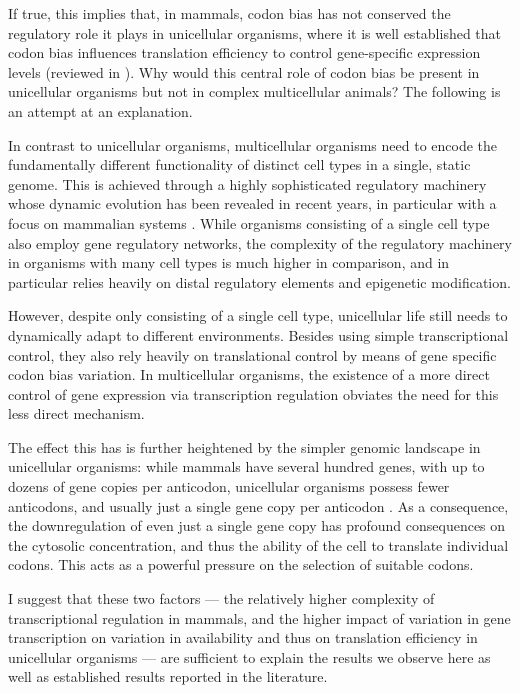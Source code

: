 If true, this implies that, in mammals, codon bias has not conserved the
regulatory role it plays in unicellular organisms, where it is well established
that codon bias influences translation efficiency to control gene-specific
expression levels (reviewed in \citet{Plotkin:2010a}). Why would this central
role of codon bias be present in unicellular organisms but not in complex
multicellular animals? The following is an attempt at an explanation.

In contrast to unicellular organisms, multicellular organisms need to encode the
fundamentally different functionality of distinct cell types in a single, static
genome. This is achieved through a highly sophisticated regulatory machinery
whose dynamic evolution has been revealed in recent years, in particular with a
focus on mammalian systems \citep{Villar:2015}. While  organisms consisting of a
single cell type also employ gene regulatory networks, the complexity of the
regulatory machinery in organisms with many cell types is much higher in
comparison, and in particular relies heavily on distal regulatory elements and
epigenetic modification.

However, despite only consisting of a single cell type, unicellular life still
needs to dynamically adapt to different environments. Besides using simple
transcriptional control, they also rely heavily on translational control by
means of gene specific codon bias variation. In multicellular organisms, the
existence of a more direct control of gene expression via transcription
regulation obviates the need for this less direct mechanism.

The effect this has is further heightened by the simpler genomic \trna landscape
in unicellular organisms: while mammals have several hundred \trna genes, with
up to dozens of gene copies per anticodon, unicellular organisms possess fewer
anticodons, and usually just a single \trna gene copy per anticodon
\citep{Chan:2009}. As a consequence, the downregulation of even just a single
\trna gene copy has profound consequences on the cytosolic \trna concentration,
and thus the ability of the cell to translate individual codons. This acts as a
powerful pressure on the selection of suitable codons.

I suggest that these two factors — the relatively higher complexity of
transcriptional regulation in mammals, and the higher impact of variation in
\trna gene transcription on variation in \trna availability and thus on
translation efficiency in unicellular organisms — are sufficient to explain the
results we observe here as well as established results reported in the
literature.

